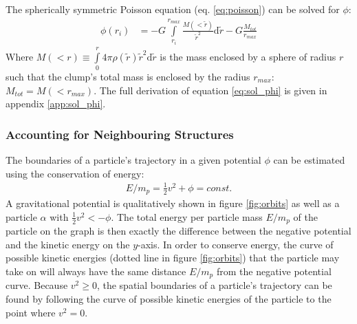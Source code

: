The spherically symmetric Poisson equation (eq. \ref{eq:poisson}) can be solved for $\phi$:
%
\begin{align}
	\phi (r_i) &=  - G \int\limits_{r_i}^{r_{max}} \frac{M(<\tilde{r})}{\tilde{r}^2} \mathrm{d}\tilde{r}
	- G  \frac{M_{tot}}{r_{max}}
	\label{eq:sol_phi}
\end{align}
%
Where $M(<r) \equiv \int\limits_0^r 4 \pi \rho(\tilde{r})\tilde{r}^2 \mathrm{d}\tilde{r} $ is the mass enclosed by a sphere of radius $r$ such that the clump's total mass is enclosed by the radius $r_{max}$: $M_{tot} = M(<r_{max})$.
The full derivation of equation \eqref{eq:sol_phi} is given in appendix \ref{app:sol_phi}.





















\subsubsection{Accounting for Neighbouring Structures}\label{chap:neighbours}

The boundaries of a particle's trajectory in a given potential $\phi$ can be estimated using the conservation of energy:
%
\begin{align}
	E/m_p = \frac{1}{2} v^2 + \phi = const.
\end{align}
%
A gravitational potential is qualitatively shown in figure \eqref{fig:orbits} as well as a particle $\alpha$ with $\frac{1}{2}v^2 < - \phi$.
The total energy per particle mass $E/m_p$ of the particle on the graph is then exactly the difference between the negative potential and the kinetic energy on the $y$-axis.
In order to conserve energy, the curve of possible kinetic energies (dotted line in figure \ref{fig:orbits}) that the particle may take on will always have the same distance $E/m_p$ from the negative potential curve.
Because $v^2\geq 0$, the spatial boundaries of a particle's trajectory can be found by following the curve of possible kinetic energies of the particle to the point where $v^2 = 0$.

